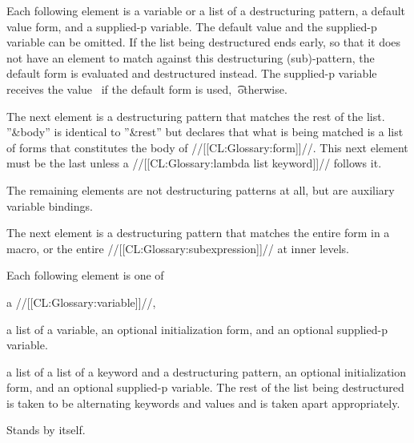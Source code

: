 \beginlist
{}

Each following element is a variable or a list of a destructuring
pattern, a default value form, and a supplied-p variable.  The default value and
the supplied-p variable can be omitted.  
If the list being destructured ends
early, so that it does not have an element to match against this destructuring
(sub)-pattern, the default form is evaluated and destructured instead.  The
supplied-p variable receives the value 
\nil\ if the default form is used, \t\ otherwise.
 

The next element is a destructuring pattern that matches the
rest of the list.  ''&body'' is identical to ''&rest'' but declares that what
is being matched is a list of forms that constitutes the body of //[[CL:Glossary:form]]//.
This next element must be the last unless a //[[CL:Glossary:lambda list keyword]]// follows it.
 

The remaining elements are not destructuring patterns at all, but are
auxiliary variable bindings.  


 

The next element is a destructuring pattern that matches the entire
form in a macro, or the entire //[[CL:Glossary:subexpression]]// at inner levels.





 

Each following element is one of
\beginlist

\itemitem{}
 a //[[CL:Glossary:variable]]//,

 a list of a variable,
           an optional initialization form,
       and an optional supplied-p variable.

 a list of a list of a keyword and a destructuring pattern,
           an optional initialization form,
       and an optional supplied-p variable.
\endlist
The rest of the list being destructured
is taken to be alternating keywords and values and is taken apart appropriately.
 

Stands by itself.
\endlist 



 
\endsubsubsubsection%










